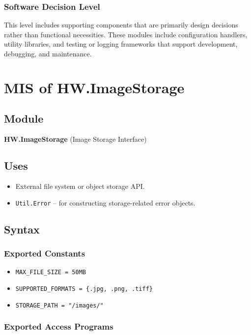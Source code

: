 \documentclass[12pt, titlepage]{article}
\begin{document}
\subsubsection{Software Decision Level}
This level includes supporting components that are primarily design decisions rather than functional necessities. These modules include configuration handlers, utility libraries, and testing or logging frameworks that support development, debugging, and maintenance.


\section{MIS of HW.ImageStorage} \label{HW.ImageStorage}

\subsection{Module}
\textbf{HW.ImageStorage} \; (Image Storage Interface)

\subsection{Uses}
\begin{itemize}
    \item External file system or object storage API.
    \item \texttt{Util.Error} – for constructing storage-related error objects.
\end{itemize}

\subsection{Syntax}

\subsubsection{Exported Constants}
\begin{itemize}
    \item \texttt{MAX\_FILE\_SIZE = 50MB}
    \item \texttt{SUPPORTED\_FORMATS = \{.jpg, .png, .tiff\}}
    \item \texttt{STORAGE\_PATH = "/images/"}
\end{itemize}

\subsubsection{Exported Access Programs}
\end{document}
